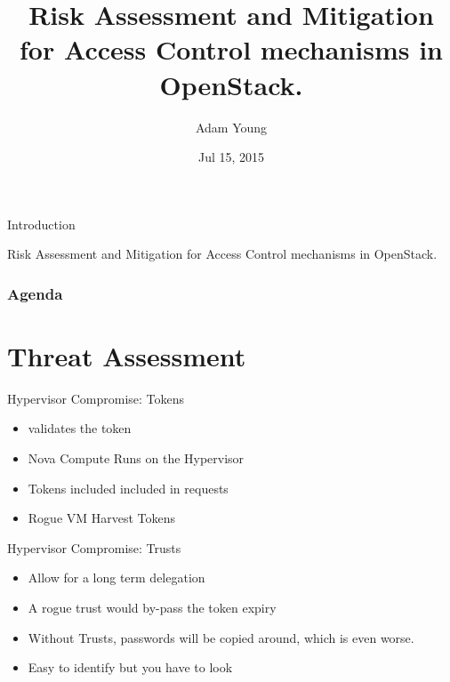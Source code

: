 \documentclass{beamer}
\title[OpenStack Liberty Keystone Midcycle ]{ Risk Assessment and Mitigation for Access Control mechanisms in OpenStack.
}
\author{Adam Young}
\institute{Red Hat Identity Management Team}
\date{Jul 15, 2015}
\begin{document}


\begin{frame}
  \titlepage
\end{frame}

\begin{frame}{Introduction}
  \begin{center}
    \begin{exampleblock}{}
      Risk Assessment and Mitigation for Access Control mechanisms in OpenStack.
    \end{exampleblock}
  \end{center}
\end{frame}

\begin{frame}
  \frametitle{Agenda}
  \tableofcontents
\end{frame}


\section{Threat Assessment}


\begin{frame}{Hypervisor Compromise: Tokens }
  \begin{itemize}
  \item validates the token
  \item Nova Compute Runs on the Hypervisor
  \item Tokens included included in requests
  \item Rogue VM Harvest Tokens
  \end{itemize}
\end{frame}


\begin{frame}{Hypervisor Compromise: Trusts}
  \begin{itemize}
  \item Allow for a long term delegation
  \item A rogue trust would by-pass the token expiry
  \item Without Trusts, passwords will be copied around, which is even worse.
  \item Easy to identify but you have to look
  \end{itemize}
\end{frame}
\end{document}
